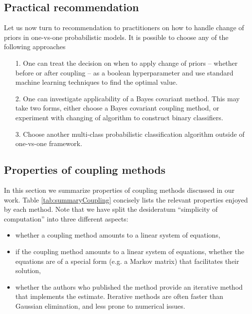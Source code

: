 \subsection{Practical recommendation}

Let us now turn to recommendation to practitioners on how to handle change of priors in one-vs-one probabilistic models. It is possible to choose any of the following approaches

\begin{itemize}
\item[1.] One can treat the decision on when to apply change of priors -- whether before or after coupling -- as a boolean hyperparameter and use standard machine learning techniques to find the optimal value.
\item[2.] One can investigate applicability of a Bayes covariant method. This may take two forms, either choose a Bayes covariant coupling method, or experiment with changing of algorithm to construct binary classifiers. 
\item[3.] Choose another multi-class probabilistic classification algorithm outside of one-vs-one framework. 
\end{itemize}


\subsection{Properties of coupling methods}

In this section  we summarize properties of coupling methods discussed in our work.  Table \ref{tab:summaryCoupling} concisely lists the relevant properties enjoyed by each method. Note that we have split the desideratum ``simplicity of computation'' into three different aspects:
\begin{itemize}
	\item whether a coupling method amounts to a linear system of equations,
	\item if the coupling method amounts to a linear system of equations, whether the equations are of a special form (e.g. a Markov matrix) that facilitates their solution,
	\item whether the authors who published the method provide an iterative method that implements the estimate. Iterative methods are often  faster than Gaussian elimination, and less prone to numerical issues.
\end{itemize}




